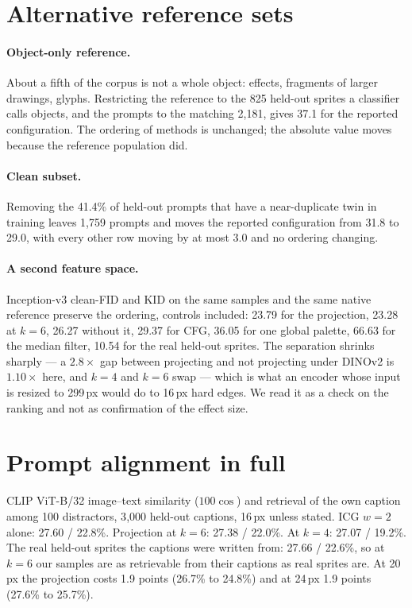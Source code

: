\documentclass[10pt,twocolumn,letterpaper]{article}
\begin{document}
\section{Alternative reference sets}
\label{sup:refs}

\paragraph{Object-only reference.}
About a fifth of the corpus is not a whole object: effects, fragments of larger drawings, glyphs. Restricting the
reference to the 825 held-out sprites a classifier calls objects, and the prompts to the matching 2{,}181, gives 37.1
for the reported configuration. The ordering of methods is unchanged; the absolute value moves because the reference
population did.

\paragraph{Clean subset.}
Removing the 41.4\% of held-out prompts that have a near-duplicate twin in training leaves 1{,}759 prompts and moves
the reported configuration from 31.8 to 29.0, with every other row moving by at most 3.0 and no ordering changing.

\paragraph{A second feature space.}
Inception-v3 clean-FID and KID on the same samples and the same native reference preserve the ordering, controls
included: 23.79 for the projection, 23.28 at $k{=}6$, 26.27 without it, 29.37 for CFG, 36.05 for one global palette,
66.63 for the median filter, 10.54 for the real held-out sprites. The separation shrinks sharply --- a $2.8\times$ gap
between projecting and not projecting under DINOv2 is $1.10\times$ here, and $k{=}4$ and $k{=}6$ swap --- which is what
an encoder whose input is resized to 299\,px would do to 16\,px hard edges. We read it as a check on the ranking and
not as confirmation of the effect size.

\section{Prompt alignment in full}
\label{sup:clip}

CLIP ViT-B/32 image--text similarity ($100\cos$) and retrieval of the own caption among 100 distractors, 3{,}000
held-out captions, 16\,px unless stated. ICG $w{=}2$ alone: 27.60 / 22.8\%. Projection at $k{=}6$: 27.38 / 22.0\%. At
$k{=}4$: 27.07 / 19.2\%. The real held-out sprites the captions were written from: 27.66 / 22.6\%, so at $k{=}6$ our
samples are as retrievable from their captions as real sprites are. At 20\,px the projection costs 1.9 points (26.7\%
to 24.8\%) and at 24\,px 1.9 points (27.6\% to 25.7\%).
\end{document}
